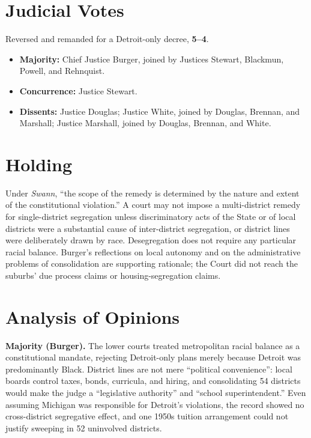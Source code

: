 \documentclass[12pt]{article}
\begin{document}
\section{Judicial Votes}

Reversed and remanded for a Detroit-only decree, \textbf{5--4}.
\begin{itemize}
\item \textbf{Majority:} Chief Justice Burger, joined by Justices Stewart, Blackmun, Powell, and Rehnquist.
\item \textbf{Concurrence:} Justice Stewart.
\item \textbf{Dissents:} Justice Douglas; Justice White, joined by Douglas, Brennan, and Marshall; Justice Marshall, joined by Douglas, Brennan, and White.
\end{itemize}

\section{Holding}

Under \textit{Swann}, ``the scope of the remedy is determined by the nature and extent of the constitutional violation.'' A court may not impose a multi-district remedy for single-district segregation unless discriminatory acts of the State or of local districts were a substantial cause of inter-district segregation, or district lines were deliberately drawn by race. Desegregation does not require any particular racial balance. Burger's reflections on local autonomy and on the administrative problems of consolidation are supporting rationale; the Court did not reach the suburbs' due process claims or housing-segregation claims.

\section{Analysis of Opinions}

\textbf{Majority (Burger).} The lower courts treated metropolitan racial balance as a constitutional mandate, rejecting Detroit-only plans merely because Detroit was predominantly Black. District lines are not mere ``political convenience'': local boards control taxes, bonds, curricula, and hiring, and consolidating 54 districts would make the judge a ``legislative authority'' and ``school superintendent.'' Even assuming Michigan was responsible for Detroit's violations, the record showed no cross-district segregative effect, and one 1950s tuition arrangement could not justify sweeping in 52 uninvolved districts.
\end{document}
